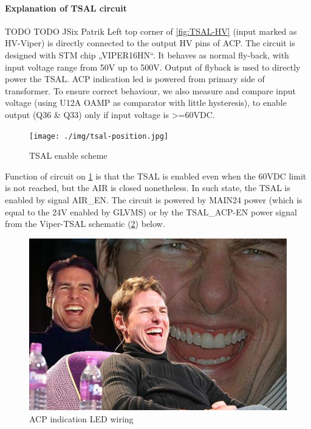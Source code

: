 \paragraph{Explanation of TSAL circuit}

TODO TODO JSix Patrik Left top corner of \ref{fig:TSAL-HV} (input marked as HV-Viper) is directly connected to the output HV pins of ACP. The circuit is designed with STM chip „VIPER16HN“. It behaves as normal fly-back, with input voltage range from 50V up to 500V. Output of flyback is used to directly power the TSAL. ACP indication led is powered from primary side of transformer. To ensure correct behaviour, we also measure and compare input voltage (using U12A OAMP as comparator with little hysteresis), to enable output (Q36 \& Q33) only if input voltage is >=60VDC.

\begin{figure}[H]
	\centering
	\texttt{[image: ./img/tsal-position.jpg]}
	\caption{TSAL enable scheme}
	\label{fig:TSAL-enable}
\end{figure}

Function of circuit on \ref{fig:TSAL-enable} is that the TSAL is enabled even when the 60VDC limit is not reached, but the AIR is closed nonetheless. In such state, the TSAL is enabled by signal AIR\_EN. The circuit is powered by MAIN24 power (which is equal to the 24V enabled by GLVMS) or by the TSAL\_ACP-EN power signal from the Viper-TSAL schematic (\ref{fig:TSAL-ACPindicator}) below.

\begin{figure}[H]
	\centering
	\includegraphics[width=\textwidth]{./img/tsal-indicator.jpg}
	\caption{ACP indication LED wiring}
	\label{fig:TSAL-ACPindicator}
\end{figure}

